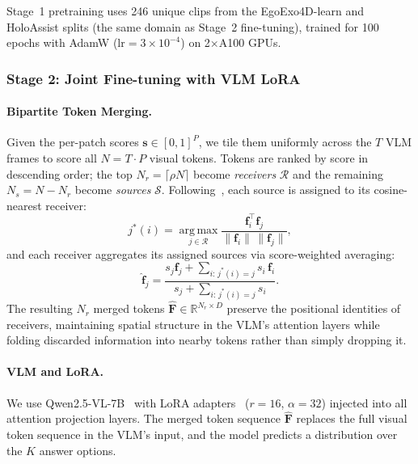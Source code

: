 Stage~1 pretraining uses 246 unique clips from the EgoExo4D-learn and HoloAssist
splits (the same domain as Stage~2 fine-tuning), trained for 100 epochs with
AdamW ($\mathrm{lr}{=}3{\times}10^{-4}$) on 2$\times$A100 GPUs.

\subsubsection{Stage 2: Joint Fine-tuning with VLM LoRA}
\label{sec:stage2}

\paragraph{Bipartite Token Merging.}
Given the per-patch scores $\mathbf{s} \in [0,1]^P$, we tile them uniformly
across the $T$ VLM frames to score all $N = T \cdot P$ visual tokens.
Tokens are ranked by score in descending order; the top
$N_r = \lceil \rho N \rceil$ become \emph{receivers} $\mathcal{R}$ and the
remaining $N_s = N - N_r$ become \emph{sources} $\mathcal{S}$.
Following~\citet{bolya2023tome}, each source is assigned to its cosine-nearest receiver:
\begin{equation}
    j^*(i) = \operatorname*{arg\,max}_{j \in \mathcal{R}}
              \frac{\mathbf{f}_i^\top \mathbf{f}_j}{\|\mathbf{f}_i\|\,\|\mathbf{f}_j\|},
\end{equation}
and each receiver aggregates its assigned sources via score-weighted averaging:
\begin{equation}
    \hat{\mathbf{f}}_j =
        \frac{s_j \mathbf{f}_j + \sum_{i:\, j^*(i)=j} s_i\, \mathbf{f}_i}
             {s_j + \sum_{i:\, j^*(i)=j} s_i}.
\end{equation}
The resulting $N_r$ merged tokens $\hat{\mathbf{F}} \in \mathbb{R}^{N_r \times D}$
preserve the positional identities of receivers, maintaining spatial structure in the
VLM's attention layers while folding discarded information into nearby tokens
rather than simply dropping it.

\paragraph{VLM and LoRA.}
We use Qwen2.5-VL-7B~\cite{wang2024qwen2vl} with LoRA adapters~\cite{hu2022lora}
($r{=}16$, $\alpha{=}32$) injected into all attention projection layers.
The merged token sequence $\hat{\mathbf{F}}$ replaces the full visual token sequence
in the VLM's input, and the model predicts a distribution over the $K$ answer options.

